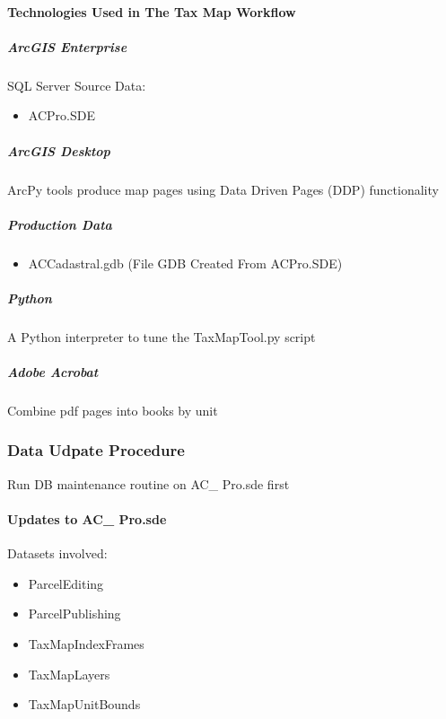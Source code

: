 \paragraph{Technologies Used in The Tax Map Workflow}
\begin{adjmulticols}{2}{\innerMar}{\outerMar}
\subparagraph{ArcGIS Enterprise}
SQL Server Source Data:
\begin{itemize}
\item ACPro.SDE
\end{itemize}
\subparagraph{ArcGIS Desktop}\noindent ArcPy tools produce map pages using Data Driven Pages (DDP) functionality
\subparagraph{Production Data}
\begin{itemize}
\item ACCadastral.gdb {\tiny (File GDB Created From ACPro.SDE)}
\end{itemize}
\subparagraph{Python}\noindent A Python interpreter to tune the TaxMapTool.py script  
  
  
\subparagraph{Adobe Acrobat}\noindent Combine pdf pages into books by unit
\end{adjmulticols}



\clearpage
\subsubsection{Data Udpate Procedure}
Run DB maintenance routine on AC\_ Pro.sde first

\paragraph{Updates to AC\_ Pro.sde}
Datasets involved:

\begin{itemize}
\item ParcelEditing
\item ParcelPublishing
\item TaxMapIndexFrames
\item TaxMapLayers
\item TaxMapUnitBounds
\end{itemize}
\clearpage

